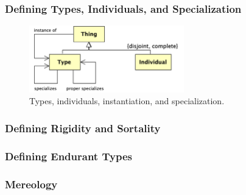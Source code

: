 \documentclass{article}
\newcommand{\BeginEndurantTaxonomyOfPropertiesBegin}{194}
\newcommand{\EndEndurantTaxonomyOfPropertiesEnd}{271}
\newcommand{\BeginInstantationAndSpecialzation}{273}
\newcommand{\EndInstantationAndSpecialzation}{356}
\newcommand{\BeginRigidityAndSortality}{360}
\newcommand{\EndRigidityAndSortality}{626}
\newcommand{\BeginEndurantsTypesDefinition}{630}
\newcommand{\EndEndurantsTypesDefinition}{832}
\begin{document}


\subsubsection{Defining Types, Individuals, and Specialization}

\begin{figure}[ht]
    \centering
    \includegraphics[width=0.6\textwidth]{diagrams/Instantiation_Diagram.png}
    \caption{Types, individuals, instantiation, and specialization.}
    \label{fig:instantiation_and_specialization}
\end{figure}



\subsubsection{Defining Rigidity and Sortality}



\subsubsection{Defining Endurant Types}



\subsubsection{Mereology}
\end{document}
